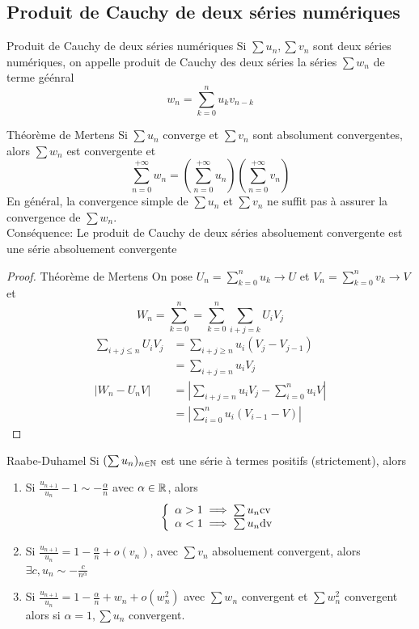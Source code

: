 \documentclass[]{report}
\begin{document}
\subsection*{Produit de Cauchy de deux séries numériques}

\begin{df}{Produit de Cauchy de deux séries numériques}{}
    Si $\sum u_n,\sum v_n$ sont deux séries numériques, on appelle produit de Cauchy des deux séries la séries $\sum w_n$ de terme géénral
    \[w_n =\sum_{k=0}^{n} u_k v_{n-k}\]
\end{df}

\begin{tm}{Théorème de Mertens}{}
    Si $\sum u_n$ converge et $\sum v_n$ sont absolument convergentes, alors $\sum w_n$ est convergente et
    \[\sum_{n=0}^{+\infty} w_n=\left(\sum_{n=0}^{+\infty} u_n\right)\left(\sum_{n=0}^{+\infty} v_n\right)\]
    En général, la convergence simple de $\sum u_n$ et $\sum v_n$ ne suffit pas à assurer la convergence de $\sum w_n$.\\
    Conséquence: Le produit de Cauchy de deux séries absoluement convergente est une série absoluement convergente
\end{tm}

\begin{proof}{Théorème de Mertens}{}
    On pose $U_n=\sum_{k=0}^{n} u_k \to U$ et $V_n=\sum_{k=0}^{n} v_k\to V$ et
    \[W_n =\sum_{k=0}^{n} =\sum_{k=0}^{n} \sum_{i+j=k}U_i V_j\]
    \begin{align*}
        \sum_{i+j\le n} U_i V_j   & = \sum_{i+j\ge n} u_i \left( V_j- V_{j-1}\right)          \\
                                  & =\sum_{i+j=n} u_i V_j                                     \\
        \left| W_n - U_n V\right| & =\left|\sum_{i+j=n} u_i V_j - \sum_{i=0}^n u_i V\right|   \\
                                  & =\left| \sum_{i=0}^{n} u_i \left( V_{i-1}-V\right)\right|
    \end{align*}
\end{proof}

\begin{prop}{Raabe-Duhamel}{}
    Si $(\sum u_n)_{n\in\mathbb{N}}$ est une série à termes positifs (strictement), alors
    \begin{enumerate}
        \item Si $\frac{u_{n+1}}{u_n}-1\sim -\frac{\alpha}{n}$ avec $\alpha \in \mathbb{R}$, alors
        \[\left\{\begin{array}{ll} \alpha >1\implies \sum u_n \text{cv}\\ \alpha <1\implies \sum u_n \text{dv} \end{array} \right.\]
        \item Si $\frac{u_{n+1}}{u_n}=1-\frac{\alpha}{n}+ o(v_n)$, avec $\sum v_n$ absoluement convergent, alors $\exists c,u_n\sim -\frac{c}{n^\alpha}$
        \item Si $\frac{u_{n+1}}{u_n}=1-\frac{\alpha}{n}+w_n+o(w_n^2)$ avec $\sum w_n$ convergent et $\sum w_n^2$ convergent alors si $\alpha=1,\sum u_n$ convergent.
    \end{enumerate}
\end{prop}
\end{document}
